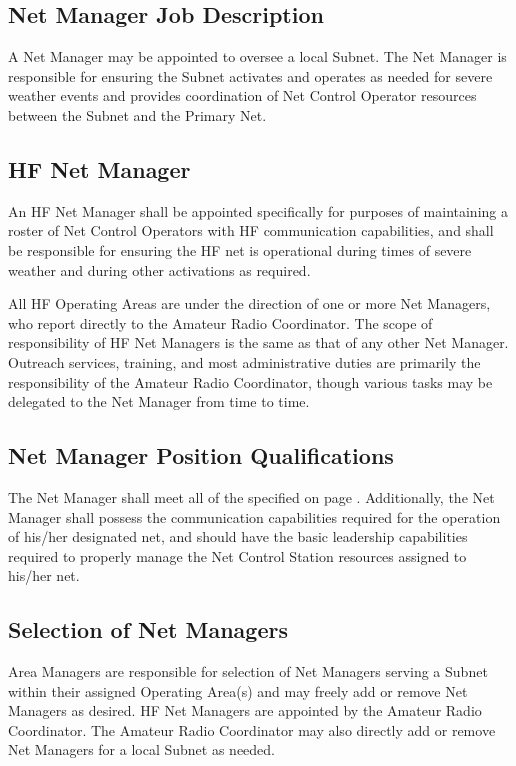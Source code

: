 \documentclass[pdflatex,letterpaper,twoside,12pt]{book}
\begin{document}
\subsection{Net Manager Job Description}\label{nm-jobdesc}

A Net Manager may be appointed to oversee a local Subnet.  The Net Manager is responsible for ensuring the Subnet activates and operates as needed for severe weather events and provides coordination of Net Control Operator resources between the Subnet and the Primary Net.

\subsection{HF Net Manager}

An HF Net Manager shall be appointed specifically for purposes of maintaining a roster of Net Control Operators with HF communication capabilities, and shall be responsible for ensuring the HF net is operational during times of severe weather and during other activations as required.

All HF Operating Areas are under the direction of one or more Net Managers, who report directly to the Amateur Radio Coordinator.  The scope of responsibility of HF Net Managers is the same as that of any other Net Manager.  Outreach services, training, and most administrative duties are primarily the responsibility of the Amateur Radio Coordinator, though various tasks may be delegated to the Net Manager from time to time.

\subsection{Net Manager Position Qualifications}

The Net Manager shall meet all of the  specified on page \pageref{nco-criteria}.  Additionally, the Net Manager shall possess the communication capabilities required for the operation of his/her designated net, and should have the basic leadership capabilities required to properly manage the Net Control Station resources assigned to his/her net.

\subsection{Selection of Net Managers}

Area Managers are responsible for selection of Net Managers serving a Subnet within their assigned Operating Area(s) and may freely add or remove Net Managers as desired.  HF Net Managers are appointed by the Amateur Radio Coordinator.  The Amateur Radio Coordinator may also directly add or remove Net Managers for a local Subnet as needed.
\end{document}
